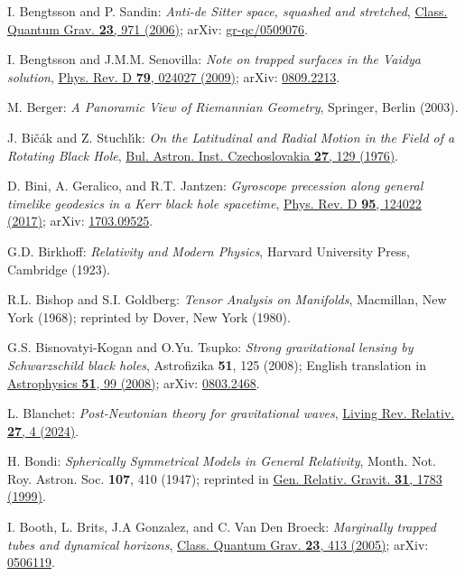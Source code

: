 \begin{thebibliography}{123}
I. Bengtsson and P. Sandin:
{\em Anti-de Sitter space, squashed and stretched},
\href{https://doi.org/10.1088/0264-9381/23/3/022}{Class. Quantum Grav. {\bf 23}, 971 (2006)};
arXiv: \href{https://arxiv.org/abs/gr-qc/0509076}{gr-qc/0509076}.

I. Bengtsson and J.M.M. Senovilla:
{\em Note on trapped surfaces in the Vaidya solution},
\href{https://doi.org/10.1103/PhysRevD.79.024027}{Phys. Rev. D {\bf 79}, 024027 (2009)};
arXiv: \href{https://arxiv.org/abs/0809.2213}{0809.2213}.

M. Berger: {\em A Panoramic View of Riemannian Geometry},
Springer, Berlin (2003).

J. Bi\v{c}\'{a}k and Z. Stuchl\'{\i}k:
{\em On the Latitudinal and Radial Motion in the Field of a Rotating Black Hole},
\href{https://ui.adsabs.harvard.edu/abs/1976BAICz..27..129B}{Bul. Astron. Inst. Czechoslovakia {\bf 27}, 129 (1976)}.

D. Bini, A. Geralico, and R.T. Jantzen:
{\em Gyroscope precession along general timelike geodesics in a Kerr black hole spacetime},
\href{https://doi.org/10.1103/PhysRevD.95.124022}{Phys. Rev. D {\bf 95}, 124022 (2017)};
arXiv: \href{https://arxiv.org/abs/1703.09525}{1703.09525}.

G.D. Birkhoff:
{\em Relativity and Modern Physics},
Harvard University Press, Cambridge (1923).

R.L. Bishop and S.I. Goldberg:
{\em Tensor Analysis on Manifolds},
Macmillan, New York (1968); reprinted by Dover, New York (1980).

G.S. Bisnovatyi-Kogan and O.Yu. Tsupko:
{\em Strong gravitational lensing by Schwarzschild black holes},
Astrofizika {\bf 51}, 125 (2008); English translation in
\href{https://doi.org/10.1007/s10511-008-0011-8}{Astrophysics {\bf 51}, 99 (2008)};
arXiv: \href{https://arxiv.org/abs/0803.2468}{0803.2468}.

L. Blanchet:
{\em Post-Newtonian theory for gravitational waves},
\href{https://doi.org/10.1007/s41114-024-00050-z}{Living Rev. Relativ. {\bf 27}, 4 (2024)}.

H. Bondi:
{\em Spherically Symmetrical Models in General Relativity},
Month. Not. Roy. Astron. Soc. {\bf 107}, 410 (1947);
reprinted in
\href{https://doi.org/10.1023/A:1026726520289}{Gen. Relativ. Gravit. {\bf 31}, 1783 (1999)}.

I. Booth, L. Brits, J.A Gonzalez, and C. Van Den Broeck:
{\em Marginally trapped tubes and dynamical horizons},
\href{https://doi.org/10.1088/0264-9381/23/2/009}{Class. Quantum Grav. {\bf 23}, 413 (2005)};
arXiv: \href{https://arxiv.org/abs/gr-qc/0506119}{0506119}.


\end{thebibliography}
